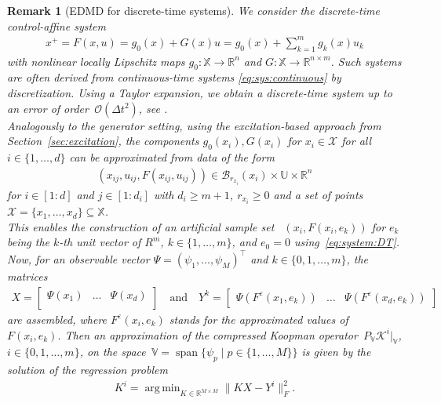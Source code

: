\documentclass[a4paper, reqno]{amsart}
\newcommand{\R}{\ensuremath{\mathbb R}}
\DeclareMathOperator*{\argmin}{arg\,min}
\newtheorem{remark}[theorem]{Remark}
\begin{document}
\begin{remark}[EDMD for discrete-time systems]\label{rem:EDMD:operator}
    We consider the discrete-time control-affine system
\begin{align}\label{eq:system:DT}
    x^+ = F(x, u) = g_0(x) + G(x)u = g_0(x) + \sum\limits_{k = 1}^m {g}_k(x) u_k
\end{align}
with nonlinear locally Lipschitz maps $g_0: \mathbb{X} \rightarrow \mathbb{R}^n$ and $G:\mathbb X\rightarrow \mathbb R^{n\times m}$. 
Such systems are often derived from continuous-time systems \eqref{eq:sys:continuous} by discretization. Using a Taylor expansion, we obtain a discrete-time system up to an error of order~$\mathcal{O}(\Delta t^2)$, see \cite[Remark 4.1]{BoldPhil24}. \\
Analogously to the generator setting, using the excitation-based approach from Section~\ref{sec:excitation}, the components 
$g_0(x_i), G(x_i)$ for $x_i \in \mathcal{X}$ for all $i \in \{1, \dots, d\}$ can be approximated from data of the form 
\begin{align}\label{eq:data:operator}
    (x_{ij},u_{ij},F(x_{ij},u_{ij})) \in  \mathcal{B}_{r_{x_i}}(x_i)
    \times \mathbb{U} \times \mathbb{R}^n
\end{align} 
for $i\in [1:d]$ and $j \in [1:d_i]$ with $d_i \geq m + 1$, $r_{x_i} \geq 0$ and a set of points~$\mathcal{X} = \{x_1, \dots, x_d\} \subseteq \mathbb{X}$. \\
This enables the construction of an artificial sample set~
$(x_i,F(x_i,e_k))$ for $e_k$ being the $k$-th unit vector of $R^m$, $k \in \{1, \dots, m\}$, and $e_0 = 0$ using~\eqref{eq:system:DT}. 
Now, for an observable vector $\Psi = (\psi_1, \dots, \psi_M)^\top$ and $k\in\{0,1,\dots,m\}$, the matrices 
\begin{align*}
    X = \begin{bmatrix}
        \Psi(x_1) & \dots & \Psi(x_d) \\
    \end{bmatrix} \quad \text{and} \quad 
    Y^k = \begin{bmatrix}
        \Psi(F^\varepsilon(x_1, e_k)) & \dots & \Psi(F^\varepsilon(x_d, e_k))
    \end{bmatrix}
\end{align*}
 are assembled, where $F^\varepsilon(x_i, e_k)$ stands for the approximated values of $F(x_i, e_k)$. Then an approximation of the compressed Koopman operator~$P_{\mathbb{V}}\mathcal{K}^i|_{\mathbb{V}}$, $i\in\{0,1,\dots,m\}$, on the space~$\mathbb{V} = \operatorname{span}\{\psi_p \mid p \in \{1, \dots ,M\}\}$ is given by the solution of the regression problem 
\begin{align} \label{eq:operator:regression}
    K^i = \argmin_{K \in \R^{M \times M}} \|KX - Y^i\|_F^2.
\end{align}
    
\end{remark}
\end{document}
